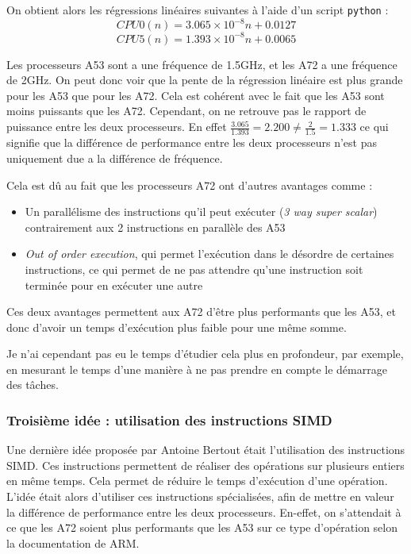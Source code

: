 On obtient alors les régressions linéaires suivantes à l'aide d'un script \texttt{python} :
\[
    CPU0(n) =  3.065 \times 10^{-8} n +  0.0127 
\] 
\[
    CPU5(n) =  1.393 \times 10^{-8} n +  0.0065
\]

Les processeurs A53 sont a une fréquence de 1.5GHz, et les A72 a une fréquence de 2GHz. On peut donc voir que la pente de la régression linéaire est plus grande pour les A53 que pour les A72. Cela est cohérent avec le fait que les A53 sont moins puissants que les A72. Cependant, on ne retrouve pas le rapport de puissance entre les deux processeurs. En effet $\frac{3.065}{1.393} = 2.200 \neq \frac{2}{1.5} = 1.333$ ce qui signifie que la différence de performance entre les deux processeurs n'est pas uniquement due a la différence de fréquence.


Cela est dû au fait que les processeurs A72 ont d'autres avantages comme :
\begin{itemize}
    \item Un parallélisme des instructions qu'il peut exécuter (\textit{3 way super scalar}) contrairement aux 2 instructions en parallèle des A53
    \item \textit{Out of order execution}, qui permet l’exécution dans le désordre de certaines instructions, ce qui permet de ne pas attendre qu'une instruction soit terminée pour en exécuter une autre
\end{itemize}

Ces deux avantages permettent aux A72 d'être plus performants que les A53, et donc d'avoir un temps d'exécution plus faible pour une même somme.

Je n'ai cependant pas eu le temps d'étudier cela plus en profondeur, par exemple, en mesurant le temps d'une manière à ne pas prendre en compte le démarrage des tâches. 


\subsubsection{Troisième idée : utilisation des instructions SIMD}

Une dernière idée proposée par Antoine Bertout était l'utilisation des instructions SIMD. Ces instructions permettent de réaliser des opérations sur plusieurs entiers en même temps. Cela permet de réduire le temps d'exécution d'une opération. L'idée était alors d'utiliser ces instructions spécialisées, afin de mettre en valeur la différence de performance entre les deux processeurs. En-effet, on s'attendait à ce que les A72 soient plus performants que les A53 sur ce type d'opération selon la documentation de ARM.